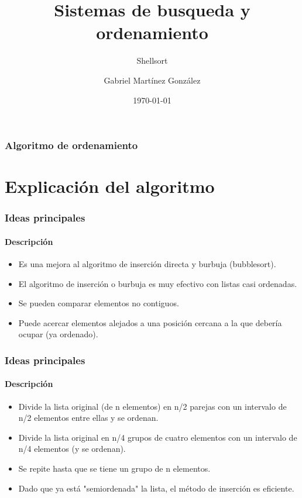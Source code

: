 \documentclass{beamer}
\title{Sistemas de busqueda y ordenamiento}
\subtitle{Shellsort}
\author[Mart\'inez] 
{Gabriel Mart\'{i}nez Gonz\'alez}
\institute[ESFM] 
{
  Escuela Superior de F\'{\i}sica y Matem\'aticas\\
  Instituto Polit\'ecnico Nacional}
\date[\today]{\today}
\begin{document}
\begin{frame}
  \titlepage
\end{frame}

\begin{frame}
  \frametitle{Algoritmo de ordenamiento}
  \tableofcontents
\end{frame}

\section{Explicaci\'on del algoritmo}

\begin{frame}
  \frametitle{Ideas principales}
  \framesubtitle{Descripci\'on}
  \begin{itemize}[<+->] %
  \item {Es una mejora al algoritmo de inserci\'on directa y burbuja (bubblesort).}
  \item {El algoritmo de inserci\'on o burbuja es muy efectivo con listas casi ordenadas.}
  \item {Se pueden comparar elementos no contiguos.}
  \item {Puede acercar elementos alejados a una posici\'on cercana a la que deber\'{i}a ocupar (ya ordenado).}
  \end{itemize}
\end{frame}

\begin{frame}
  \frametitle{Ideas principales}
  \framesubtitle{Descripci\'on}
  \begin{itemize}[<+->] %
  \item {Divide la lista original (de n elementos) en n/2 parejas con un intervalo de n/2 elementos entre ellas y se ordenan.}
  \item {Divide la lista original en n/4 grupos de cuatro elementos con un intervalo de n/4 elementos (y se ordenan).}
  \item {Se repite hasta que se tiene un grupo de n elementos.}
  \item {Dado que ya est\'a "semiordenada" la lista, el m\'etodo de inserci\'on es eficiente.}
  \end{itemize}
\end{frame}
\end{document}
